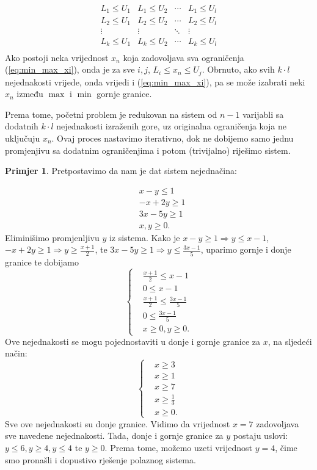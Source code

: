 \documentclass[a4paper, utf8, 11pt, colorlinks]{book}
\theoremstyle{definition}
\newtheorem{primjer}{Primjer}[chapter]
\begin{document}
 $$\begin{array}{cccc}
       L_1 \leq U_1 & L_1 \leq U_2   &  \cdots   & L_1 \leq U_l \\
       L_2 \leq U_1 & L_2  \leq U_2  &  \cdots   & L_2 \leq U_l \\
       \vdots       &     \vdots     &   \ddots  & \vdots       \\
       L_k \leq U_1 &  L_k \leq U_2  &   \cdots  & L_k \leq U_l \\
 \end{array}$$ 
Ako postoji neka vrijednost  $x_n$ koja zadovoljava sva ograničenja (\ref{eq:min_max_xi}), onda je za sve $i,j$, 
$L_i \leq x_n \leq U_j$. Obrnuto, ako svih $k \cdot l$ nejednakosti vrijede, onda vrijedi i (\ref{eq:min_max_xi}), pa se može izabrati neki $x_n$ između $\max$ i $\min$ gornje granice. 

Prema tome, početni problem je redukovan na sistem od $n-1$ varijabli sa dodatnih  $k \cdot l$ nejednakosti izraženih gore, uz originalna ograničenja koja ne uključuju $x_n$. Ovaj proces nastavimo iterativno, dok ne dobijemo samo jednu promjenjivu sa dodatnim ograničenjima  i potom (trivijalno) riješimo sistem. 

\begin{primjer} Pretpostavimo da nam je dat sistem nejednačina:
	\end{primjer}
\begin{align*}
	 &x - y \leq 1 \\
	 &-x + 2y \geq 1 \\
	 & 3x - 5y \geq 1 \\
	 & x,y \geq 0.
\end{align*}
Eliminišimo promjenljivu $y$ iz sistema. Kako je $x-y \geq 1 \Rightarrow y \leq x -1 $, 
$-x + 2y \geq 1 \Rightarrow y \geq \frac{x+1}{2}$, te $ 3x - 5y \geq 1 \Rightarrow y \leq \frac{3x-1}{5}$, uparimo gornje i donje granice te dobijamo 
 $$
 \begin{cases}
 	&\frac{x+1}{2} \leq x-1 \\
 	& 0 \leq x-1 \\
 	& \frac{x+1}{2} \leq \frac{3x-1}{5} \\
 	& 0 \leq \frac{3x-1}{5} \\
 	& x \geq 0, y \geq 0.  	
 \end{cases}
 $$
Ove nejednakosti se mogu pojednostaviti u donje i gornje granice za $x$, na sljedeći način:
$$
\begin{cases}
    &x \geq 3 \\
    & x \geq 1 \\
    & x \geq 7 \\
    & x \geq \frac{1}{3} \\
    & x \geq 0.	
\end{cases}
$$
Sve ove nejednakosti su donje granice. Vidimo da vrijednost $x=7$ zadovoljava sve navedene nejednakosti.
Tada, donje i gornje granice za $y$ postaju uslovi: $y \leq 6, y \geq 4, y \leq 4$ te $y \geq 0$. Prema tome, možemo uzeti vrijednost $y=4$, čime smo pronašli i dopustivo rješenje polaznog sistema. 
\vspace{1.5cm}
\end{document}
